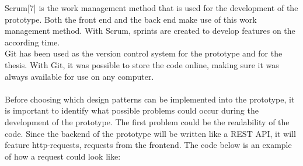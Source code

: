 \documentclass[paper=a4, fontsize=11pt,twoside]{scrartcl}	%
\begin{document}
Scrum[7] is the work management method that is used for the development of the prototype. Both the front end and the back end make use of this work management method. With Scrum, sprints are created to develop features on the according time. \\ 
Git has been used as the version control system for the prototype and for the thesis. With Git, it was possible to store the code online, making sure it was always available for use on any computer.
\\ \\
Before choosing which design patterns can be implemented into the prototype, it is important to identify what possible problems could occur during the development of the prototype. The first problem could be the readability of the code. Since the backend of the prototype will be written like a REST API, it will feature http-requests, requests from the frontend. The code below is an example of how a request could look like:
\end{document}
